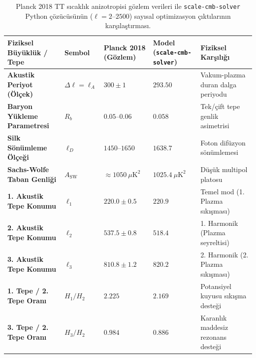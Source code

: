 \begin{table}[h!]
    \centering
    \small
    \begin{tabular}{@{}lllll@{}}
        \toprule
        \textbf{Fiziksel Büyüklük / Tepe}   & \textbf{Sembol}       & \textbf{Planck 2018 (Gözlem)}   & \textbf{Model (\texttt{scale-cmb-solver})} & \textbf{Fiziksel Karşılığı}        \\ \midrule
        \textbf{Akustik Periyot (Ölçek)}    & $\Delta\ell = \ell_A$ & $300 \pm 1$                     & $293.50$                                   & Vakum-plazma duran dalga periyodu  \\
        \textbf{Baryon Yükleme Parametresi} & $R_b$                 & $0.05\text{--}0.06$             & $0.058$                                    & Tek/çift tepe genlik asimetrisi    \\
        \textbf{Silk Sönümleme Ölçeği}      & $\ell_D$              & $1450\text{--}1650$             & $1638.7$                                   & Foton difüzyon sönümlemesi         \\
        \textbf{Sachs-Wolfe Taban Genliği}  & $A_{\mathrm{SW}}$     & $\approx 1050\ \mu\mathrm{K}^2$ & $1025.4\ \mu\mathrm{K}^2$                  & Düşük multipol platosu             \\ \addlinespace
        \textbf{1. Akustik Tepe Konumu}     & $\ell_1$              & $220.0 \pm 0.5$                 & $220.9$                                    & Temel mod (1. Plazma sıkışması)    \\
        \textbf{2. Akustik Tepe Konumu}     & $\ell_2$              & $537.5 \pm 0.8$                 & $518.4$                                    & 1. Harmonik (Plazma seyreltisi)    \\
        \textbf{3. Akustik Tepe Konumu}     & $\ell_3$              & $810.8 \pm 1.2$                 & $820.2$                                    & 2. Harmonik (2. Plazma sıkışması)  \\ \addlinespace
        \textbf{1. Tepe / 2. Tepe Oranı}    & $H_1 / H_2$           & $2.225$                         & $2.169$                                    & Potansiyel kuyusu sıkışma desteği  \\
        \textbf{3. Tepe / 2. Tepe Oranı}    & $H_3 / H_2$           & $0.984$                         & $0.886$                                    & Karanlık maddesiz rezonans desteği \\ \bottomrule
    \end{tabular}
    \caption{Planck 2018 TT sıcaklık anizotropisi gözlem verileri ile \texttt{scale-cmb-solver} Python çözücüsünün ($\ell = 2\text{--}2500$) sayısal optimizasyon çıktılarının karşılaştırması.}
    \label{tab:cmb_planck_fit}
\end{table}

